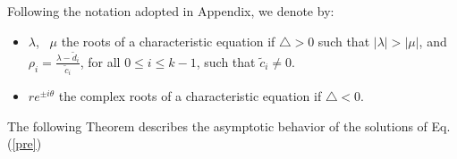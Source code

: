 \documentclass[11pt]{amsart}
\theoremstyle{definition}
\theoremstyle{remark}
\theoremstyle{example}
\numberwithin{equation}{section}
\begin{document}
\vspace{1mm}
Following the notation adopted in Appendix, we denote by:
\begin{itemize}[leftmargin=*]
  \item $\lambda$, \ $\mu$ the roots of a characteristic equation if $\triangle >0$ such that $|\lambda|>|\mu|$, and $\displaystyle{\rho_i=\frac{\lambda-\tilde{d}_i}{\tilde{c}_i}}$, for all $0\leq i\leq k-1$, such that $\tilde{c}_i\neq0$.
  \item $\displaystyle{re^{\pm i\theta}}$ the complex roots of a characteristic equation if $\triangle<0.$
\end{itemize}
\vspace{3mm}
 \hspace{3mm}The following Theorem describes the asymptotic behavior of the solutions of Eq.(\ref{pre})
\medskip
\end{document}
